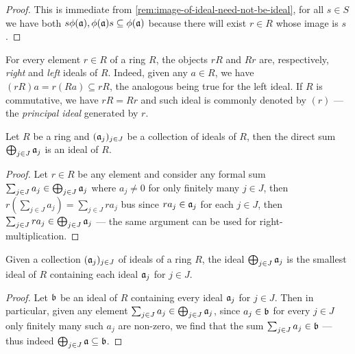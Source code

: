 \begin{proof}
    This is immediate from \cref{rem:image-of-ideal-need-not-be-ideal}, for all \(s
    \in S\) we have both \(s \phi(\mathfrak{a}), \phi(\mathfrak{a}) s \subseteq
    \phi(\mathfrak{a})\) because there will exist \(r \in R\) whose image is \(s\).
\end{proof}

\begin{example}
    \label{exp:ideal-out-of-an-element}
    For every element \(r \in R\) of a ring \(R\), the objects \(r R\) and \(R r\)
    are, respectively, \emph{right} and \emph{left} ideals of \(R\). Indeed, given
    any \(a \in R\), we have \((r R) a = r (R a) \subseteq r R\), the analogous
    being true for the left ideal. If \(R\) is commutative, we have \(r R = R r\)
    and such ideal is commonly denoted by \((r)\) --- the \emph{principal ideal}
    generated by \(r\).
\end{example}

\begin{proposition}
    \label{prop:direct-sum-of-ideals-is-ideal}
    Let \(R\) be a ring and \((\mathfrak{a}_j)_{j \in J}\) be a collection of ideals of
    \(R\), then the direct sum \(\bigoplus_{j \in J} \mathfrak{a}_j\) is an ideal of
    \(R\).
\end{proposition}

\begin{proof}
    Let \(r \in R\) be any element and consider any formal sum
    \(\sum_{j \in J} a_j \in \bigoplus_{j \in J} \mathfrak{a}_j\) where \(a_j \neq 0\)
    for only finitely many \(j \in J\), then
    \(r (\sum_{j \in J} a_j) = \sum_{j \in J} r a_j\) bus since
    \(r a_j \in \mathfrak{a}_j\) for each \(j \in J\), then
    \(\sum_{j \in J} r a_j \in \bigoplus_{j \in J} \mathfrak{a}_j\) --- the same
    argument can be used for right-multiplication.
\end{proof}

\begin{lemma}
    \label{lem:direct-sum-smallest-ideal}
    Given a collection \((\mathfrak{a}_j)_{j \in J}\) of ideals of a ring \(R\), the
    ideal \(\bigoplus_{j \in J} \mathfrak{a}_j\) is the smallest ideal of \(R\)
    containing each ideal \(\mathfrak{a}_j\) for \(j \in J\).
\end{lemma}

\begin{proof}
    Let \(\mathfrak{b}\) be an ideal of \(R\) containing every ideal \(\mathfrak{a}_j\)
    for \(j \in J\). Then in particular, given any element
    \(\sum_{j \in J} a_j \in \bigoplus_{j \in J} \mathfrak{a}_j\), since
    \(a_j \in \mathfrak{b}\) for every \(j \in J\) only finitely many such \(a_j\) are
    non-zero, we find that the sum \(\sum_{j \in J} a_j \in \mathfrak{b}\) --- thus
    indeed \(\bigoplus_{j \in J} \mathfrak{a} \subseteq \mathfrak{b}\).
\end{proof}


